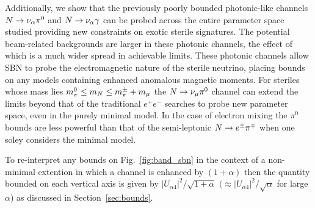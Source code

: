 \documentclass[11pt, a4paper]{article}
\newcommand{\reffig}[1]{Fig.~\ref{#1}}
\newcommand{\refsec}[1]{Section~\ref{#1}}
\def\ster{\ensuremath N}
\begin{document}
Additionally, we show that the previously poorly bounded photonic-like
channels $\ster \rightarrow \nu_\alpha \pi^0$ and $\ster \rightarrow \nu_\alpha
\gamma$ can be probed across the entire parameter space studied providing new
constraints on exotic sterile signatures. The potential beam-related
backgrounds are larger in these photonic channels, the effect of which is a
much wider spread in achievable limits. These photonic channels allow SBN to
probe the electromagnetic nature of the sterile neutrino, placing bounds on any
models containing enhanced anomalous magnetic moments. 
%
For steriles whose mass lies  $m_\pi^0 \leq m_\ster \leq m_\pi^\pm +m_\mu$ the
$\ster \rightarrow \nu_\mu \pi^0$ channel can extend the limits beyond that of
the traditional $e^+e^-$ searches to probe new parameter space, even in the
purely minimal model. In the case of electron mixing the $\pi^0$ bounds are
less powerful than that of the semi-leptonic $\ster \rightarrow e^\pm \pi^\mp$
when one soley considers the minimal model.

To re-interpret any bounds on \reffig{fig:band_sbn} in the context of a non-minimal extention in which a channel is enhanced by $(1+\alpha)$ then the quantity bounded on each vertical axis is given by  $|U_{\alpha 4}|^2/\sqrt{1+\alpha}$ $(\approx |U_{\alpha 4}|^2/\sqrt{\alpha} $ for large $\alpha$) as discussed in \refsec{sec:bounds}.  
\end{document}
